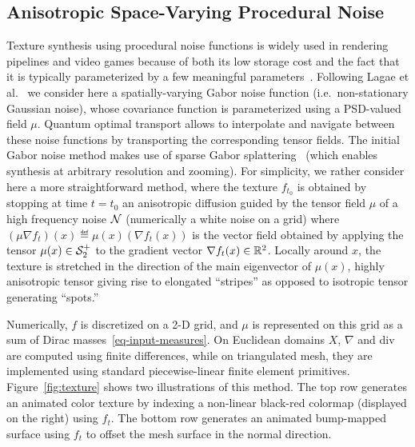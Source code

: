 
\subsection{Anisotropic Space-Varying Procedural Noise}




Texture synthesis using procedural noise functions is widely used in rendering pipelines and video games because of both its low storage cost and the fact that it is typically parameterized by a few meaningful parameters~\cite{LagaeSurvey}. 
%
Following Lagae et al.~ we consider here a spatially-varying Gabor noise function (i.e.\ non-stationary Gaussian noise), whose covariance function is parameterized using a PSD-valued field $\mu$. 
%
Quantum optimal transport allows to interpolate and navigate between these noise functions by transporting the corresponding tensor fields. 
%
The initial Gabor noise method makes use of sparse Gabor splattering~\cite{LagaeSurvey} (which enables synthesis at arbitrary resolution and zooming). For simplicity, we rather consider here a more straightforward method, where the texture $f_{t_0}$ is obtained by stopping at time $t=t_0$ an anisotropic diffusion guided by the tensor field $\mu$  of a high frequency noise $\mathcal{N}$ (numerically a white noise on a grid)
where $(\mu \nabla f_t)(x) \eqdef \mu(x) (\nabla f_t(x))$ is the vector field obtained by applying the tensor $\mu(x) \in \mathcal{S}_2^+$ to the gradient vector $\nabla f_t(x) \in \mathbb{R}^2$. 
%
Locally around $x$, the texture is stretched in the direction of the main eigenvector of $\mu(x)$,  highly anisotropic tensor giving rise to elongated ``stripes'' as opposed to isotropic tensor generating ``spots.''

Numerically, $f$ is discretized on a 2-D grid, and $\mu$ is represented on this grid as a sum of Dirac masses~\eqref{eq-input-measures}. On Euclidean domains $X$, $\nabla$ and div are computed using finite differences, while on triangulated mesh, they are implemented using standard piecewise-linear finite element primitives. 
%
Figure~\ref{fig:texture} shows two illustrations of this method. The top row generates an animated color texture by indexing a non-linear black-red colormap (displayed on the right) using $f_t$. The bottom row generates an animated bump-mapped surface using $f_t$ to offset the mesh surface in the normal direction. 


